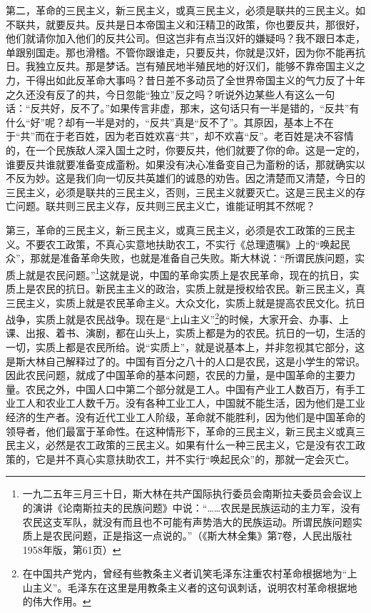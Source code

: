 \documentclass[UTF8, 12pt, a4paper]{ctexrep}
\begin{document}
第二，革命的三民主义，新三民主义，或真三民主义，必须是联共的三民主义。如不联共，就要反共。反共是日本帝国主义和汪精卫的政策，你也要反共，那很好，他们就请你加入他们的反共公司。但这岂非有点当汉奸的嫌疑吗？我不跟日本走，单跟别国走。那也滑稽。不管你跟谁走，只要反共，你就是汉奸，因为你不能再抗日。我独立反共。那是梦话。岂有殖民地半殖民地的好汉们，能够不靠帝国主义之力，干得出如此反革命大事吗？昔日差不多动员了全世界帝国主义的气力反了十年之久还没有反了的共，今日忽能“独立”反之吗？听说外边某些人有这么一句话：“反共好，反不了。”如果传言非虚，那末，这句话只有一半是错的，“反共”有什么“好”呢？却有一半是对的，“反共”真是“反不了”。其原因，基本上不在于“共”而在于老百姓，因为老百姓欢喜“共”，却不欢喜“反”。老百姓是决不容情的，在一个民族敌人深入国土之时，你要反共，他们就要了你的命。这是一定的，谁要反共谁就要准备变成齑粉。如果没有决心准备变自己为齑粉的话，那就确实以不反为妙。这是我们向一切反共英雄们的诚恳的劝告。因之清楚而又清楚，今日的三民主义，必须是联共的三民主义，否则，三民主义就要灭亡。这是三民主义的存亡问题。联共则三民主义存，反共则三民主义亡，谁能证明其不然呢？

第三，革命的三民主义，新三民主义，或真三民主义，必须是农工政策的三民主义。不要农工政策，不真心实意地扶助农工，不实行《总理遗嘱》上的“唤起民众”，那就是准备革命失败，也就是准备自己失败。斯大林说：“所谓民族问题，实质上就是农民问题。”\footnote{一九二五年三月三十日，斯大林在共产国际执行委员会南斯拉夫委员会会议上的演讲《论南斯拉夫的民族问题》中说：“……农民是民族运动的主力军，没有农民这支军队，就没有而且也不可能有声势浩大的民族运动。所谓民族问题实质上是农民问题，正是指这一点说的。”（《斯大林全集》第7卷，人民出版社1958年版，第61页）}这就是说，中国的革命实质上是农民革命，现在的抗日，实质上是农民的抗日。新民主主义的政治，实质上就是授权给农民。新三民主义，真三民主义，实质上就是农民革命主义。大众文化，实质上就是提高农民文化。抗日战争，实质上就是农民战争。现在是“上山主义”\footnote{在中国共产党内，曾经有些教条主义者讥笑毛泽东注重农村革命根据地为“上山主义”。毛泽东在这里是用教条主义者的这句讽刺话，说明农村革命根据地的伟大作用。}的时候，大家开会、办事、上课、出报、着书、演剧，都在山头上，实质上都是为的农民。抗日的一切，生活的一切，实质上都是农民所给。说“实质上”，就是说基本上，并非忽视其它部分，这是斯大林自己解释过了的。中国有百分之八十的人口是农民，这是小学生的常识。因此农民问题，就成了中国革命的基本问题，农民的力量，是中国革命的主要力量。农民之外，中国人口中第二个部分就是工人。中国有产业工人数百万，有手工业工人和农业工人数千万。没有各种工业工人，中国就不能生活，因为他们是工业经济的生产者。没有近代工业工人阶级，革命就不能胜利，因为他们是中国革命的领导者，他们最富于革命性。在这种情形下，革命的三民主义，新三民主义或真三民主义，必然是农工政策的三民主义。如果有什么一种三民主义，它是没有农工政策的，它是并不真心实意扶助农工，并不实行“唤起民众”的，那就一定会灭亡。
\end{document}
